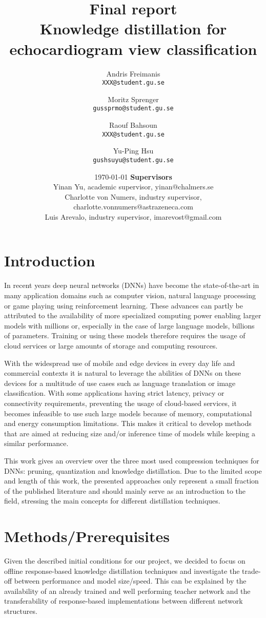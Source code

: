 \documentclass{article}
\title{Final report \\ Knowledge distillation for echocardiogram view classification}
\author{
  Andris Freimanis\\
  \texttt{XXX@student.gu.se}
  \and
  Moritz Sprenger\\
  \texttt{gussprmo@student.gu.se}
  \and
  Raouf Bahsoun\\
  \texttt{XXX@student.gu.se}
  \and
  Yu-Ping Hsu\\
  \texttt{gushsuyu@student.gu.se}
}
\date{\today \endgraf\bigskip\vspace*{12cm}
	\textbf{Supervisors}\\
	\centering Yinan Yu, academic supervisor, yinan@chalmers.se \\
	Charlotte von Numers, industry supervisor, charlotte.vonnumers@astrazeneca.com \\
	Luis Arevalo, industry supervisor, imarevost@gmail.com}
\begin{document}
\maketitle

\newpage
\tableofcontents
\newpage
\section{Introduction}
In recent years deep neural networks (DNNs) have become the state-of-the-art in many application domains such as computer vision, natural language processing or game playing using reinforcement learning. These advances can partly be attributed to the availability of more specialized computing power enabling larger models with millions or, especially in the case of large language models, billions of parameters. Training or using these models therefore requires the usage of cloud services or large amounts of storage and computing resources.

With the widespread use of mobile and edge devices in every day life and commercial contexts it is natural to leverage the abilities of DNNs on these devices for a multitude of use cases such as language translation or image classification. With some applications having strict latency, privacy or connectivity requirements, preventing the usage of cloud-based services, it becomes infeasible to use such large models because of memory, computational and energy consumption limitations. This makes it critical to develop methods that are aimed at reducing size and/or inference time of models while keeping a similar performance.

This work gives an overview over the three most used compression techniques for DNNs: pruning, quantization and knowledge distillation. Due to the limited scope and length of this work, the presented approaches only represent a small fraction of the published literature and should mainly serve as an introduction to the field, stressing the main concepts for different distillation techniques.
\newpage
\section{Methods/Prerequisites}
Given the described initial conditions for our project, we decided to focus on offline response-based knowledge distillation techniques and investigate the trade-off between performance and model size/speed. This can be explained by the availability of an already trained and well performing teacher network and the transferability of response-based implementations between different network structures.
\end{document}
